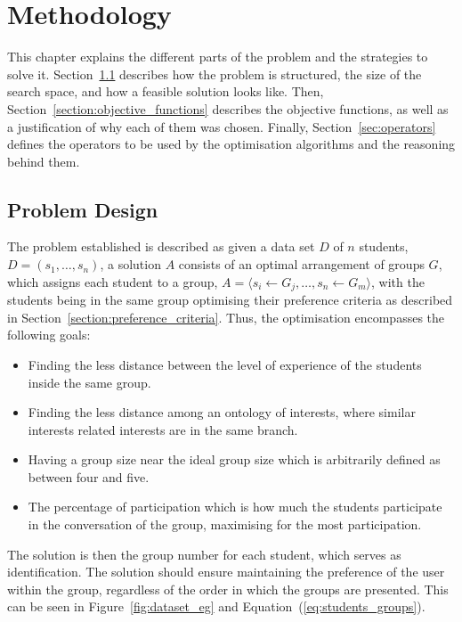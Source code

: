 \chapter{Methodology}
\label{chapter:chapter03}

This chapter explains the different parts of the problem and the strategies to solve it. Section~\ref{sec:Problem_design} describes how the problem is structured, the size of the search space, and how a feasible solution looks like. Then, Section~\ref{section:objective_functions} describes the objective functions, as well as a justification of why each of them was chosen. Finally, Section~\ref{sec:operators} defines the operators to be used by the optimisation algorithms and the reasoning behind them.\

\section{Problem Design} \label{sec:Problem_design}

The problem established is described as given a data set $D$ of $n$ students, $D = (s_1,\dots,s_n)$, a solution $A$ consists of an optimal arrangement of groups $G$, which assigns each student to a group, $A = \langle s_i \leftarrow G_j, \dots, s_n \leftarrow G_m \rangle$, with the students being in the same group optimising their preference criteria as described in Section~\ref{section:preference_criteria}. Thus, the optimisation encompasses the following goals:

\begin{itemize}
    \item Finding the less distance between the level of experience of the students inside the same group.
    \item Finding the less distance among an ontology of interests, where similar interests related interests are in the same branch.
    \item Having a group size near the ideal group size which is arbitrarily defined as between four and five.
    \item The percentage of participation which is how much the students participate in the conversation of the group, maximising for the most participation.
\end{itemize}

The solution is then the group number for each student, which serves as identification. The solution should ensure maintaining the preference of the user within the group, regardless of the order in which the groups are presented. This can be seen in Figure~\ref{fig:dataset_eg} and Equation~(\ref{eq:students_groups}).\


